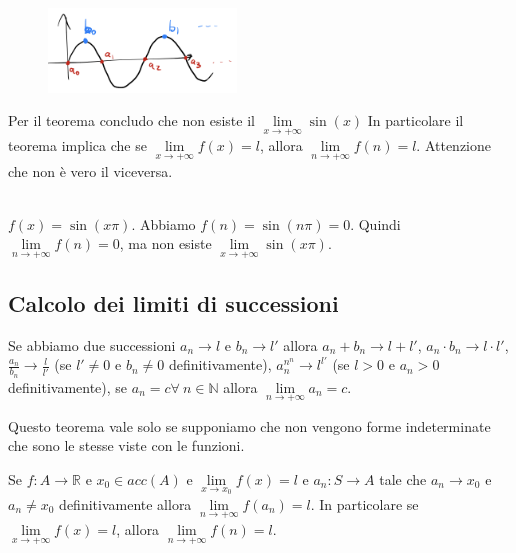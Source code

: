 \begin{figure}
    \vspace{-15pt}
    \centering
    \includegraphics[width=5cm]{images/esempio-dim-con-legame-succ-fun.png}
\end{figure}

Per il teorema concludo che non esiste il $\lim\limits_{x \to +\infty}\sin(x)$
In particolare il teorema implica che se $\lim\limits_{x\to +\infty}f(x) = l$, allora $\lim\limits_{n\to +\infty}f(n) = l$. Attenzione che non è vero il viceversa.\\\\
\begin{example}
$f(x) = \sin(x\pi)$. Abbiamo $f(n) = \sin(n\pi) = 0$. Quindi $\lim\limits_{n\to +\infty}f(n) = 0$, ma non esiste $\lim\limits_{x\to +\infty}\sin(x\pi)$.
\end{example}

\subsection{Calcolo dei limiti di successioni}
\begin{theorem}
Se abbiamo due successioni $a_n \to l$ e $b_n \to l'$ allora $a_n + b_n \to l + l'$, $a_n \cdot b_n \to l \cdot l'$, $\frac{a_n}{b_n} \to \frac{l}{l'}$ (se $l' \neq 0$ e $b_n \neq 0$ definitivamente), $a_n^{n^n} \to l^{l'}$ (se $l>0$ e $a_n > 0$ definitivamente), se $a_n = c \forall\: n \in \mathbb{N}$ allora $\lim\limits_{n\to +\infty}a_n = c$.
\end{theorem}
\hspace{-15pt}Questo teorema vale solo se supponiamo che non vengono forme indeterminate che sono le stesse viste con le funzioni.
\begin{theorem}
Se $f: A \to \mathbb{R}$ e $x_0 \in acc(A)$ e $\lim\limits_{x\to x_0}f(x) = l$ e $a_n: S \to A$ tale che $a_n \to x_0$ e $a_n \neq x_0$ definitivamente allora $\lim\limits_{n\to +\infty}f(a_n) = l$. In particolare se $\lim\limits_{x\to +\infty}f(x) = l$, allora $\lim\limits_{n\to +\infty}f(n) = l$.
\end{theorem}

